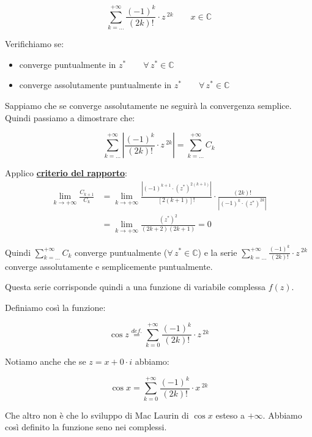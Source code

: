 \documentclass[../dimostrazioni]{subfiles}
\begin{document}
                \[  \sum_{k=\dots}^{+\infty} \frac{(-1)^k}{(2k)!} \cdot z\,^{2k} \qquad x \in \mathbb{C}  \]

                Verifichiamo se:
                \begin{itemize}
                    \item converge puntualmente in \(z^* \qquad \forall \, z^*  \in \mathbb{C}\)
                    \item converge assolutamente puntualmente in \(z^* \qquad \forall \, z^*  \in \mathbb{C}\)
                \end{itemize}
            
                Sappiamo che se converge assolutamente ne seguirà la convergenza semplice. Quindi passiamo a dimostrare che:

                \[  \sum_{k=\dots}^{+\infty} \left| \frac{(-1)^k}{(2k)!} \cdot z\,^{2k} \right| = \sum_{k=\dots}^{+\infty} C_k \]

                Applico \textbf{\hyperref[criterioRapportoSerie]{criterio del rapporto}}:
                \begin{align*}
                    \lim_{k \to +\infty} \frac{C_{k+1}}{C_k} &= \lim_{k \to +\infty} \frac{\left| (-1)^{k+1} \cdot (z^*)^{2(k+1)}\right|}{\left[2(k+1)\right]!} \cdot \frac{\left(2k\right)!}{\left| (-1)^k \cdot (z^*)^{2k}\right|} \\
                    &= \lim_{k \to +\infty} \frac{(z^*)^2}{(2k+2)(2k+1)} = 0
                \end{align*}

                Quindi \(\sum_{k=\dots}^{+\infty} C_k\) converge puntualmente (\(\forall \, z^* \in \mathbb{C}\)) 
                e la serie  \(\sum_{k=\dots}^{+\infty} \frac{(-1)^k}{(2k)!} \cdot z\,^{2k}\) converge assolutamente e semplicemente puntualmente.

                Questa serie corrisponde quindi a una funzione di variabile complessa \(f(z)\).

                Definiamo così la funzione:

                \[  \cos z \stackrel{def.}{=} \sum_{k=0}^{+\infty} \frac{(-1)^k}{(2k)!} \cdot z\,^{2k}    \]

                Notiamo anche che se \(z = x + 0 \cdot i\) abbiamo:

                \[  \cos x = \sum_{k=0}^{+\infty} \frac{(-1)^k}{(2k)!} \cdot x\,^{2k} \]

                Che altro non è che lo sviluppo di Mac Laurin di \(\cos x\) esteso a \(+\infty\). 
                Abbiamo così definito la funzione seno nei complessi.
\end{document}
